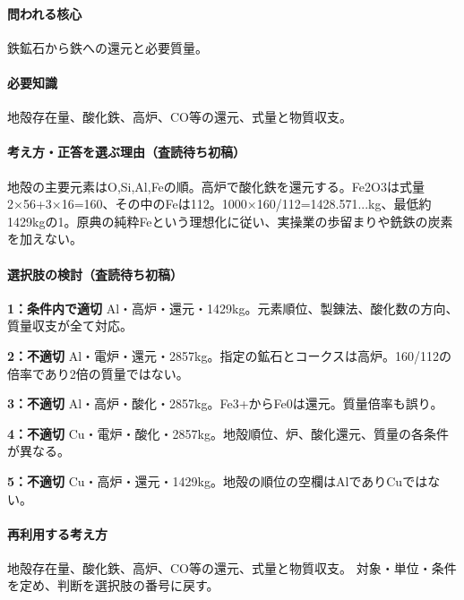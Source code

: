 \paragraph{問われる核心} 鉄鉱石から鉄への還元と必要質量。

\paragraph{必要知識} 地殻存在量、酸化鉄、高炉、CO等の還元、式量と物質収支。

\paragraph{考え方・正答を選ぶ理由（査読待ち初稿）} 地殻の主要元素はO,Si,Al,Feの順。高炉で酸化鉄を還元する。Fe2O3は式量2×56+3×16=\allowbreak{}160、その中のFeは112。1000×160/112=\allowbreak{}1428.571...kg、最低約1429kgの1。原典の純粋Feという理想化に従い、実操業の歩留まりや銑鉄の炭素を加えない。

\paragraph{選択肢の検討（査読待ち初稿）}\mbox{}\par

\noindent\textbf{1：条件内で適切} Al・高炉・還元・1429kg。元素順位、製錬法、酸化数の方向、質量収支が全て対応。\par

\noindent\textbf{2：不適切} Al・電炉・還元・2857kg。指定の鉱石とコークスは高炉。160/112の倍率であり2倍の質量ではない。\par

\noindent\textbf{3：不適切} Al・高炉・酸化・2857kg。Fe3+からFe0は還元。質量倍率も誤り。\par

\noindent\textbf{4：不適切} Cu・電炉・酸化・2857kg。地殻順位、炉、酸化還元、質量の各条件が異なる。\par

\noindent\textbf{5：不適切} Cu・高炉・還元・1429kg。地殻の順位の空欄はAlでありCuではない。\par

\paragraph{再利用する考え方} 地殻存在量、酸化鉄、高炉、CO等の還元、式量と物質収支。 対象・単位・条件を定め、判断を選択肢の番号に戻す。

